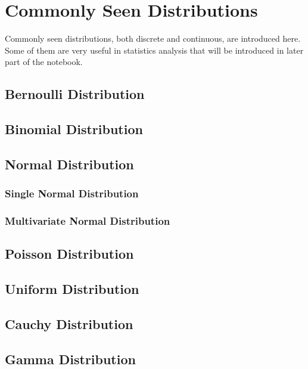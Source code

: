 \chapter{Commonly Seen Distributions} \label{ch:commondistribution}

Commonly seen distributions, both discrete and continuous, are introduced here. Some of them are very useful in statistics analysis that will be introduced in later part of the notebook.

\section{Bernoulli Distribution}

\section{Binomial Distribution}

\section{Normal Distribution}

\subsection{Single Normal Distribution}

\subsection{Multivariate Normal Distribution}

\section{Poisson Distribution}

\section{Uniform Distribution}

\section{Cauchy Distribution}

\section{Gamma Distribution}

